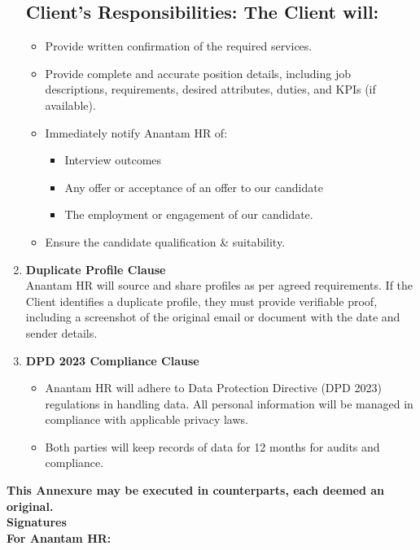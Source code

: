 \documentclass{article}
\newenvironment{customlist}
  {\begin{itemize}[leftmargin=*, label=$\bullet$, itemsep=0.5em]}
  {\end{itemize}}
\begin{document}
\begin{enumerate}[label=\arabic{enumi}.]
        \subsection*{\color{secondary} Client's Responsibilities: The Client will:}
        \begin{customlist}
            \item Provide written confirmation of the required services.
            \item Provide complete and accurate position details, including job descriptions, requirements, desired attributes, duties, and KPIs (if available).
            \item Immediately notify Anantam HR of:
            \begin{itemize}[leftmargin=*, label=$\circ$, itemsep=0.25em]
                \item Interview outcomes
                \item Any offer or acceptance of an offer to our candidate
                \item The employment or engagement of our candidate.
            \end{itemize}
            \item Ensure the candidate qualification \& suitability.
        \end{customlist}
    \item \textbf{Duplicate Profile Clause}\\
        Anantam HR will source and share profiles as per agreed requirements. If the Client identifies a duplicate profile, they must provide verifiable proof, including a screenshot of the original email or document with the date and sender details.
    \item \textbf{DPD 2023 Compliance Clause}\\
        \begin{customlist}
            \item Anantam HR will adhere to Data Protection Directive (DPD 2023) regulations in handling data. All personal information will be managed in compliance with applicable privacy laws.
            \item Both parties will keep records of data for 12 months for audits and compliance.
        \end{customlist}
\end{enumerate}

\noindent\textbf{This Annexure may be executed in counterparts, each deemed an original.}\\[1em]

\noindent\textbf{\color{secondary} Signatures}\\[0.5em]
\noindent\textbf{For Anantam HR:}
\end{document}
